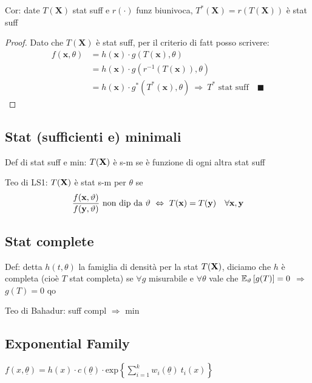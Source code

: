 Cor: date $T(\mathbf{X})$ stat suff e $r(\cdot)$ funz biunivoca, $T^*(\mathbf{X})=r(T(\mathbf{X}))$ è stat suff

\begin{proof}
Dato che $T(\mathbf{X})$ è stat suff, per il criterio di fatt posso scrivere:
\begin{align*}
f(\mathbf{x},\theta)&=h(\mathbf{x}) \cdot g(T(\mathbf{x}),\theta) \\
&=h(\mathbf{x}) \cdot g(r^{-1}(T(\mathbf{x})),\theta) \\
&=h(\mathbf{x}) \cdot g^*(T^*(\mathbf{x}),\theta) \ \Rightarrow\ T^* \text{ stat suff}\quad\blacksquare
\end{align*}
\end{proof}

\subsection{Stat (sufficienti e) minimali}

Def di stat suff e min: $T(\mathbf{X})$ è s-m se è funzione di ogni altra stat suff

\smallskip

Teo di LS1: $T(\mathbf{X})$ è stat s-m per $\theta$ se
\begin{equation*}
\frac{f(\mathbf{x},\vartheta)}{f(\mathbf{y},\vartheta)}\text{ non dip da }\vartheta\ \Leftrightarrow\ T(\mathbf{x})=T(\mathbf{y})\quad \forall \mathbf{x},\mathbf{y}
\end{equation*}

\subsection{Stat complete}

Def: detta $h(t,\theta)$ la famiglia di densità per la stat $T(\mathbf{X})$, diciamo che $h$ è completa (cioè $T$ stat completa) se $\forall g$ misurabile e $\forall \theta$ vale che $\mathbb{E}_\vartheta\left[g(T)\right]=0$ $\Rightarrow$ $g(T)=0$ qo 

\smallskip

Teo di Bahadur: suff compl $\Rightarrow$ min 

\subsection{Exponential Family}

$f(x,\underline{\theta})=h(x)\cdot c(\underline{\theta})\cdot \text{exp}\left\{\sum_{i=1}^k w_i(\underline{\theta})\ t_i(x)\right\}$

\smallskip

